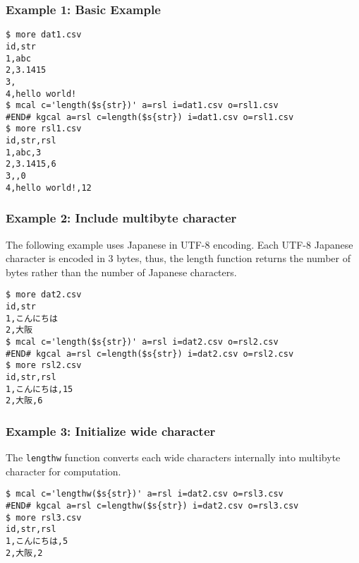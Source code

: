 \subsubsection*{Example 1: Basic Example}



\begin{Verbatim}[baselinestretch=0.7,frame=single]
$ more dat1.csv
id,str
1,abc
2,3.1415
3,
4,hello world!
$ mcal c='length($s{str})' a=rsl i=dat1.csv o=rsl1.csv
#END# kgcal a=rsl c=length($s{str}) i=dat1.csv o=rsl1.csv
$ more rsl1.csv
id,str,rsl
1,abc,3
2,3.1415,6
3,,0
4,hello world!,12
\end{Verbatim}
\subsubsection*{Example 2: Include multibyte character}

The following example uses Japanese in UTF-8 encoding. Each UTF-8 Japanese character is encoded in 3 bytes, thus, the length function returns the number of bytes rather than the number of Japanese characters.


\begin{Verbatim}[baselinestretch=0.7,frame=single]
$ more dat2.csv
id,str
1,こんにちは
2,大阪
$ mcal c='length($s{str})' a=rsl i=dat2.csv o=rsl2.csv
#END# kgcal a=rsl c=length($s{str}) i=dat2.csv o=rsl2.csv
$ more rsl2.csv
id,str,rsl
1,こんにちは,15
2,大阪,6
\end{Verbatim}
\subsubsection*{Example 3: Initialize wide character}

The \verb|lengthw| function converts each wide characters internally into multibyte character for computation.


\begin{Verbatim}[baselinestretch=0.7,frame=single]
$ mcal c='lengthw($s{str})' a=rsl i=dat2.csv o=rsl3.csv
#END# kgcal a=rsl c=lengthw($s{str}) i=dat2.csv o=rsl3.csv
$ more rsl3.csv
id,str,rsl
1,こんにちは,5
2,大阪,2
\end{Verbatim}
